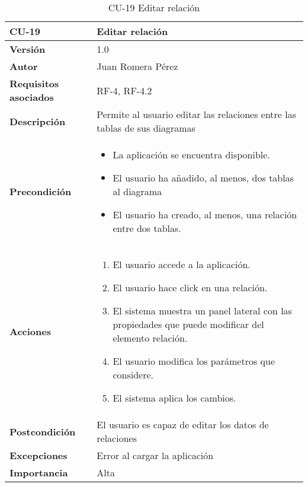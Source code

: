 \begin{table}[p]
    \centering
    \begin{tabularx}{\linewidth}{ p{} p{}}
		\toprule
		\textbf{CU-19}    & \textbf{Editar relación}\\
		\toprule
		\textbf{Versión}              & 1.0    \\
		\textbf{Autor}                & Juan Romera Pérez \\
		\textbf{Requisitos asociados} & RF-4, RF-4.2 \\
		\textbf{Descripción}          & Permite al usuario editar las relaciones entre las tablas de sus diagramas \\
		\textbf{Precondición}         & \begin{itemize}
		    \item La aplicación se encuentra disponible.
            \item El usuario ha añadido, al menos, dos tablas al diagrama
            \item El usuario ha creado, al menos, una relación entre dos tablas.
		\end{itemize} \\
		\textbf{Acciones}             &
		\begin{enumerate}
			\def\labelenumi{\arabic{enumi}.}
			\tightlist
			\item El usuario accede a la aplicación.
            \item El usuario hace click en una relación.
            \item El sistema muestra un panel lateral con las propiedades que puede modificar del elemento relación.
            \item El usuario modifica los parámetros que considere.
            \item El sistema aplica los cambios.
		\end{enumerate}\\
		\textbf{Postcondición}        & El usuario es capaz de editar los datos de relaciones \\
		\textbf{Excepciones}          & Error al cargar la aplicación \\
		\textbf{Importancia}          & Alta \\
		\bottomrule
    \end{tabularx}
    \caption{CU-19 Editar relación}
\end{table}

